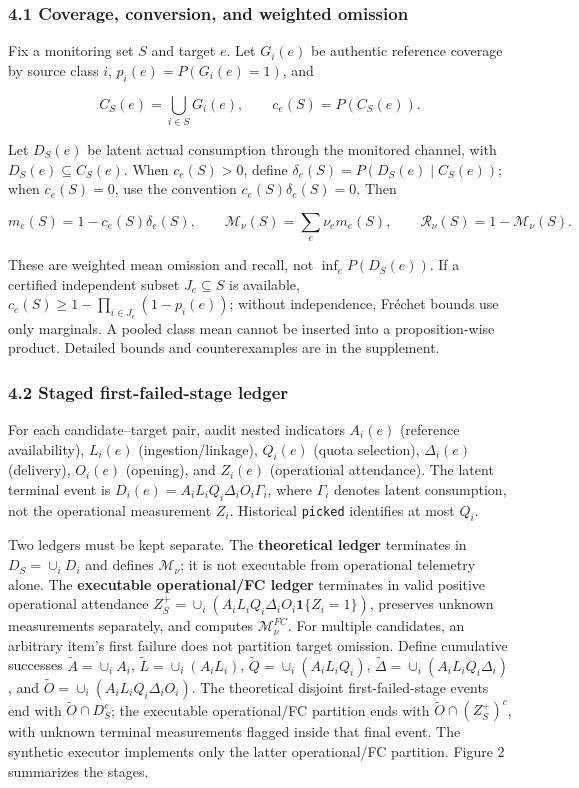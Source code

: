 \documentclass[
  11pt]{article}
\begin{document}
\subsubsection{4.1 Coverage, conversion, and weighted
omission}\label{coverage-conversion-and-weighted-omission}

Fix a monitoring set \(S\) and target \(e\). Let \(G_i(e)\) be authentic
reference coverage by source class \(i\), \(p_i(e)=P(G_i(e)=1)\), and

\[C_S(e)=\bigcup_{i\in S}G_i(e),\qquad c_e(S)=P(C_S(e)).\]

Let \(D_S(e)\) be latent actual consumption through the monitored
channel, with \(D_S(e)\subseteq C_S(e)\). When \(c_e(S)>0\), define
\(\delta_e(S)=P(D_S(e)\mid C_S(e))\); when \(c_e(S)=0\), use the
convention \(c_e(S)\delta_e(S)=0\). Then

\[m_e(S)=1-c_e(S)\delta_e(S),\qquad \mathcal M_\nu(S)=\sum_e\nu_e m_e(S),\qquad \mathcal R_\nu(S)=1-\mathcal M_\nu(S).\tag{4}\]

These are weighted mean omission and recall, not \(\inf_e P(D_S(e))\).
If a certified independent subset \(J_e\subseteq S\) is available,
\(c_e(S)\ge1-\prod_{i\in J_e}(1-p_i(e))\); without independence, Fréchet
bounds use only marginals. A pooled class mean cannot be inserted into a
proposition-wise product. Detailed bounds and counterexamples are in the
supplement.

\subsubsection{4.2 Staged first-failed-stage
ledger}\label{staged-first-failed-stage-ledger}

For each candidate--target pair, audit nested indicators \(A_i(e)\)
(reference availability), \(L_i(e)\) (ingestion/linkage), \(Q_i(e)\)
(quota selection), \(\Delta_i(e)\) (delivery), \(O_i(e)\) (opening), and
\(Z_i(e)\) (operational attendance). The latent terminal event is
\(D_i(e)=A_iL_iQ_i\Delta_iO_i\Gamma_i\), where \(\Gamma_i\) denotes
latent consumption, not the operational measurement \(Z_i\). Historical
\texttt{picked} identifies at most \(Q_i\).

Two ledgers must be kept separate. The \textbf{theoretical ledger}
terminates in \(D_S=\cup_iD_i\) and defines \(\mathcal M_\nu\); it is
not executable from operational telemetry alone. The \textbf{executable
operational/FC ledger} terminates in valid positive operational
attendance \(Z_S^+=\cup_i(A_iL_iQ_i\Delta_iO_i\mathbf1\{Z_i=1\})\),
preserves unknown measurements separately, and computes
\(\mathcal M_\nu^{FC}\). For multiple candidates, an arbitrary item's
first failure does not partition target omission. Define cumulative
successes \(\widetilde A=\cup_iA_i\), \(\widetilde L=\cup_i(A_iL_i)\),
\(\widetilde Q=\cup_i(A_iL_iQ_i)\),
\(\widetilde\Delta=\cup_i(A_iL_iQ_i\Delta_i)\), and
\(\widetilde O=\cup_i(A_iL_iQ_i\Delta_iO_i)\). The theoretical disjoint
first-failed-stage events end with \(\widetilde O\cap D_S^c\); the
executable operational/FC partition ends with
\(\widetilde O\cap (Z_S^+)^c\), with unknown terminal measurements
flagged inside that final event. The synthetic executor implements only
the latter operational/FC partition. Figure 2 summarizes the stages.
\end{document}
